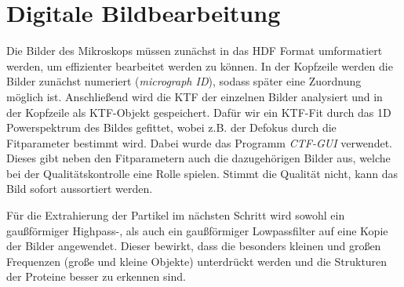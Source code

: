 \section{Digitale Bildbearbeitung} %
\label{sec:bildbearbeitung}

Die Bilder des Mikroskops müssen zunächst in das HDF Format umformatiert werden, um effizienter bearbeitet werden zu können.
In der Kopfzeile werden die Bilder zunächst numeriert (\textit{micrograph ID}), sodass später eine Zuordnung möglich ist.
Anschließend wird die KTF der einzelnen Bilder analysiert und in der Kopfzeile als KTF-Objekt gespeichert.
Dafür wir ein KTF-Fit durch das 1D Powerspektrum des Bildes gefittet, wobei z.B. der Defokus durch die Fitparameter bestimmt wird.
Dabei wurde das Programm \textit{CTF-GUI} verwendet.
Dieses gibt neben den Fitparametern auch die dazugehörigen Bilder aus, welche bei der Qualitätskontrolle eine Rolle spielen.
Stimmt die Qualität nicht, kann das Bild sofort aussortiert werden.

Für die Extrahierung der Partikel im nächsten Schritt wird sowohl ein gaußförmiger Highpass-, als auch ein gaußförmiger Lowpassfilter auf eine Kopie der Bilder angewendet.
Dieser bewirkt, dass die besonders kleinen und großen Frequenzen (große und kleine Objekte) unterdrückt werden und die Strukturen der Proteine besser zu erkennen sind.

\FloatBarrier